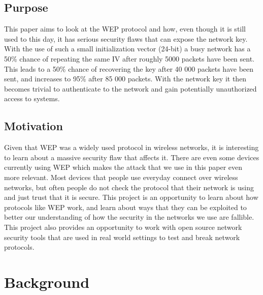 \documentclass[10pt, titlepage]{article}
\begin{document}
\subsection{Purpose}
This paper aims to look at the WEP protocol and how, even though it is still used to this day, it has serious security flaws that can expose the network key. With the use of such a small initialization vector (24-bit) a busy network has a 50\% chance of repeating the same IV after roughly 5000 packets have been sent. This leads to a 50\% chance of recovering the key after 40 000 packets have been sent, and increases to 95\% after 85 000 packets. With the network key it then becomes trivial to authenticate to the network and gain potentially unauthorized access to systems.

\subsection{Motivation}
Given that WEP was a widely used protocol in wireless networks, it is interesting to learn about a massive security flaw that affects it. There are even some devices currently using WEP which makes the attack that we use in this paper even more relevant. Most devices that people use everyday connect over wireless networks, but often people do not check the protocol that their network is using and just trust that it is secure. This project is an opportunity to learn about how protocols like WEP work, and learn about ways that they can be exploited to better our understanding of how the security in the networks we use are fallible. This project also provides an opportunity to work with open source network security tools that are used in real world settings to test and break network protocols.




\section{Background}
\end{document}
